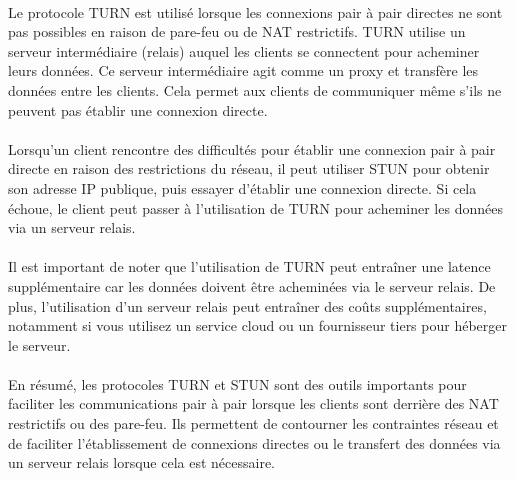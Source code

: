 \paragraph{}
Le protocole TURN est utilisé lorsque les connexions pair à pair directes ne sont pas possibles en raison de pare-feu ou de NAT restrictifs. TURN utilise un serveur intermédiaire (relais) auquel les clients se connectent pour acheminer 
leurs données. Ce serveur intermédiaire agit comme un proxy et transfère les données entre les clients. Cela permet aux clients de communiquer même s'ils ne peuvent pas établir une connexion directe.

\paragraph{}
Lorsqu'un client rencontre des difficultés pour établir une connexion pair à pair directe en raison des restrictions du réseau, il peut utiliser STUN pour obtenir son adresse IP publique, puis essayer d'établir une connexion directe. 
Si cela échoue, le client peut passer à l'utilisation de TURN pour acheminer les données via un serveur relais.

\paragraph{}
Il est important de noter que l'utilisation de TURN peut entraîner une latence supplémentaire car les données doivent être acheminées via le serveur relais. De plus, l'utilisation d'un serveur relais peut entraîner des coûts supplémentaires, 
notamment si vous utilisez un service cloud ou un fournisseur tiers pour héberger le serveur.

\paragraph{}
En résumé, les protocoles TURN et STUN sont des outils importants pour faciliter les communications pair à pair lorsque les clients sont derrière des NAT restrictifs ou des pare-feu. Ils permettent de contourner les contraintes réseau et de 
faciliter l'établissement de connexions directes ou le transfert des données via un serveur relais lorsque cela est nécessaire.
